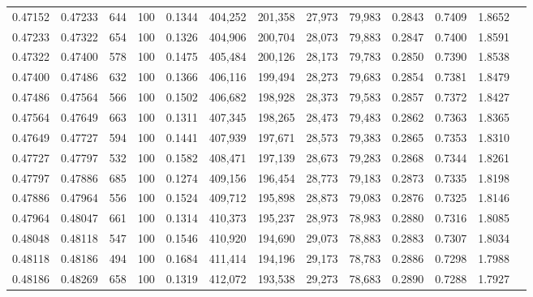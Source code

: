 \begin{tabular}{rrrrrrrrrrrrr}
0.47152 & 0.47233 &   644 & 100 &                                     0.1344 & 404,252 & 201,358 &  27,973 &  79,983 & 0.2843 & 0.7409 & 1.8652 \\
0.47233 & 0.47322 &   654 & 100 &                                     0.1326 & 404,906 & 200,704 &  28,073 &  79,883 & 0.2847 & 0.7400 & 1.8591 \\
0.47322 & 0.47400 &   578 & 100 &                                     0.1475 & 405,484 & 200,126 &  28,173 &  79,783 & 0.2850 & 0.7390 & 1.8538 \\
0.47400 & 0.47486 &   632 & 100 &                                     0.1366 & 406,116 & 199,494 &  28,273 &  79,683 & 0.2854 & 0.7381 & 1.8479 \\
0.47486 & 0.47564 &   566 & 100 &                                     0.1502 & 406,682 & 198,928 &  28,373 &  79,583 & 0.2857 & 0.7372 & 1.8427 \\
0.47564 & 0.47649 &   663 & 100 &                                     0.1311 & 407,345 & 198,265 &  28,473 &  79,483 & 0.2862 & 0.7363 & 1.8365 \\
0.47649 & 0.47727 &   594 & 100 &                                     0.1441 & 407,939 & 197,671 &  28,573 &  79,383 & 0.2865 & 0.7353 & 1.8310 \\
0.47727 & 0.47797 &   532 & 100 &                                     0.1582 & 408,471 & 197,139 &  28,673 &  79,283 & 0.2868 & 0.7344 & 1.8261 \\
0.47797 & 0.47886 &   685 & 100 &                                     0.1274 & 409,156 & 196,454 &  28,773 &  79,183 & 0.2873 & 0.7335 & 1.8198 \\
0.47886 & 0.47964 &   556 & 100 &                                     0.1524 & 409,712 & 195,898 &  28,873 &  79,083 & 0.2876 & 0.7325 & 1.8146 \\
0.47964 & 0.48047 &   661 & 100 &                                     0.1314 & 410,373 & 195,237 &  28,973 &  78,983 & 0.2880 & 0.7316 & 1.8085 \\
0.48048 & 0.48118 &   547 & 100 &                                     0.1546 & 410,920 & 194,690 &  29,073 &  78,883 & 0.2883 & 0.7307 & 1.8034 \\
0.48118 & 0.48186 &   494 & 100 &                                     0.1684 & 411,414 & 194,196 &  29,173 &  78,783 & 0.2886 & 0.7298 & 1.7988 \\
0.48186 & 0.48269 &   658 & 100 &                                     0.1319 & 412,072 & 193,538 &  29,273 &  78,683 & 0.2890 & 0.7288 & 1.7927 \\

\end{tabular}
